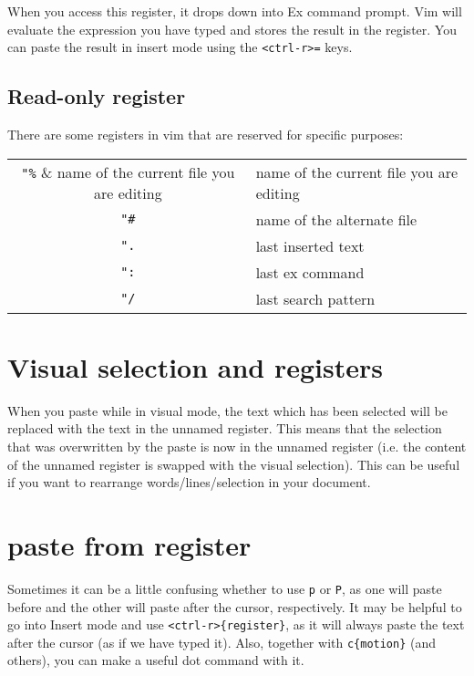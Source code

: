 When you access this register, it drops down into Ex command prompt.
Vim will evaluate the expression you have typed and stores the result in the register.
You can paste the result in insert mode using the \verb|<ctrl-r>=| keys.

\subsection{Read-only register}

There are some registers in vim that are reserved for specific purposes:
\newline

\begin{tabular}{c|l}
    \verb|"%| & name of the current file you are editing\\
    \verb|"#| & name of the alternate file\\
    \verb|".| & last inserted text\\
    \verb|":| & last ex command\\
    \verb|"/| & last search pattern\\
\end{tabular}
\newline

\section{Visual selection and registers}

When you paste while in visual mode, the text which has been selected will be replaced with the text in the unnamed register.
This means that the selection that was overwritten by the paste is now in the unnamed register (i.e. the content of the unnamed register is swapped with the visual selection).
This can be useful if you want to rearrange words/lines/selection in your document.

\section{paste from register}

Sometimes it can be a little confusing whether to use \verb|p| or \verb|P|, as one will paste before and the other will paste after the cursor, respectively.
It may be helpful to go into Insert mode and use \verb|<ctrl-r>{register}|, as it will always paste the text after the cursor (as if we have typed it).
Also, together with \verb|c{motion}| (and others), you can make a useful dot command with it.
